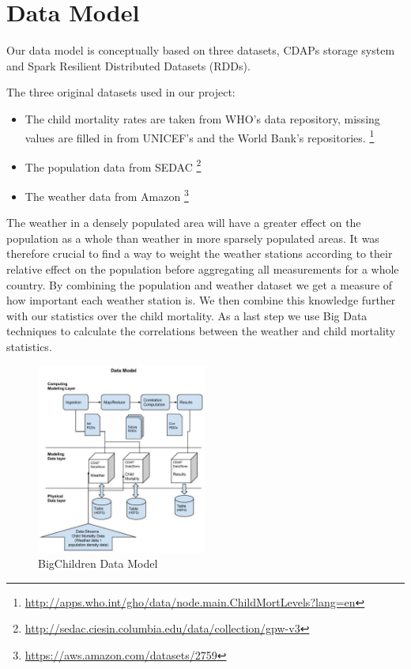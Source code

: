 \documentclass[
10pt, %
a4paper, %
oneside, %
headinclude,footinclude, %
useAMS,
usenatbib
]{mn2e}  %
\begin{document}
\section{Data Model}
Our data model is conceptually based on three datasets, CDAPs storage system and Spark Resilient Distributed Datasets (RDDs).

The three original datasets used in our project:
\begin{itemize}
\item The child mortality rates are taken from WHO's data repository, missing values are filled in from UNICEF's and the World Bank's repositories.
  \footnote{\url{http://apps.who.int/gho/data/node.main.ChildMortLevels?lang=en}}
\item The population data from SEDAC
    \footnote{\url{http://sedac.ciesin.columbia.edu/data/collection/gpw-v3}}
\item The weather data from Amazon
    \footnote{\url{https://aws.amazon.com/datasets/2759}}
\end{itemize}

The weather in a densely populated area will have a greater effect on the population as a whole than weather in more sparsely populated areas. It was therefore crucial to find a way to weight the weather stations according to their relative effect on the population before aggregating all measurements for a whole country. By combining the population and weather dataset we get a measure of how important each weather station is. We then combine this knowledge further with our statistics over the child mortality. As a last step we use Big Data techniques to calculate the correlations between the weather and child mortality statistics.

\begin{figure}
    \includegraphics[width=0.5\textwidth]{BigChild_DataModel}
    \caption{BigChildren Data Model}
    \label{fig:Data Model}
\end{figure}
\end{document}
